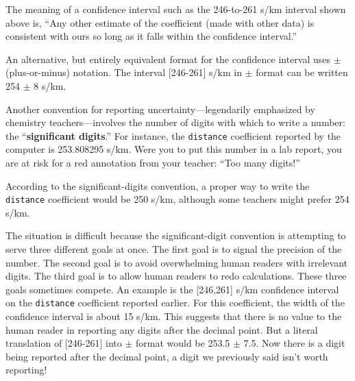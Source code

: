 \documentclass[
  letterpaper,
  DIV=11,
  numbers=noendperiod,
  oneside]{scrartcl}
\begin{document}
The meaning of a confidence interval such as the 246-to-261 s/km
interval shown above is, ``Any other estimate of the coefficient (made
with other data) is consistent with ours so long as it falls within the
confidence interval.''

An alternative, but entirely equivalent format for the confidence
interval uses \(\pm\) (plus-or-minus) notation. The interval
{[}246-261{]} s/km in \(\pm\) format can be written 254 \(\pm\) 8 s/km.

\begin{tcolorbox}[enhanced jigsaw, colbacktitle=quarto-callout-note-color!10!white, opacityback=0, breakable, opacitybacktitle=0.6, colback=white, coltitle=black, arc=.35mm, title=\textcolor{quarto-callout-note-color}{\faInfo}\hspace{0.5em}{Significant digits?}, left=2mm, colframe=quarto-callout-note-color-frame, rightrule=.15mm, bottomrule=.15mm, leftrule=.75mm, bottomtitle=1mm, toptitle=1mm, titlerule=0mm, toprule=.15mm]

Another convention for reporting uncertainty---legendarily emphasized by
chemistry teachers---involves the number of digits with which to write a
number: the ``\textbf{significant digits}.'' For instance, the
\texttt{distance} coefficient reported by the computer is 253.808295
s/km. Were you to put this number in a lab report, you are at risk for a
red annotation from your teacher: ``Too many digits!''

According to the significant-digits convention, a proper way to write
the \texttt{distance} coefficient would be 250 s/km, although some
teachers might prefer 254 s/km.

The situation is difficult because the significant-digit convention is
attempting to serve three different goals at once. The first goal is to
signal the precision of the number. The second goal is to avoid
overwhelming human readers with irrelevant digits. The third goal is to
allow human readers to redo calculations. These three goals sometimes
compete. An example is the {[}246,261{]} s/km confidence interval on the
\texttt{distance} coefficient reported earlier. For this coefficient,
the width of the confidence interval is about 15 s/km. This suggests
that there is no value to the human reader in reporting any digits after
the decimal point. But a literal translation of {[}246-261{]} into
\(\pm\) format would be 253.5 \(\pm\) 7.5. Now there is a digit being
reported after the decimal point, a digit we previously said isn't worth
reporting!


\end{tcolorbox}
\end{document}
